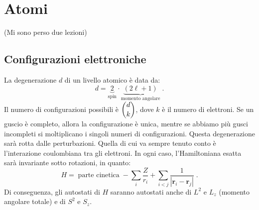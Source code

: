 \documentclass[12pt,a4paper]{report}
\theoremstyle{definition}
\numberwithin{equation}{section}
\begin{document}
\chapter{Atomi}
(Mi sono perso due lezioni)
\section{Configurazioni elettroniche}
La degenerazione $d$ di un livello atomico è data da:
\begin{equation}
d=\underbrace{2}_{\mbox{spin}}\cdot \underbrace{(2\ell +1)}_{\mbox{momento angolare}}\;.
\end{equation}
Il numero di configurazioni possibili è $\dbinom{d}{k}$, dove $k$ è il numero di elettroni. Se un guscio è completo, allora la configurazione è unica, mentre se abbiamo più gusci incompleti si moltiplicano i singoli numeri di configurazioni. Questa degenerazione sarà rotta dalle perturbazioni. Quella di cui va sempre tenuto conto è l'interazione coulombiana tra gli elettroni. In ogni caso, l'Hamiltoniana esatta sarà invariante sotto rotazioni, in quanto:
\begin{equation}
H=\;\mbox{parte cinetica}\;-\sum_i \frac{Z}{r_i}+\sum_{i<j}\frac{1}{|\mathbf{r}_i-\mathbf{r}_j|}\;.
\end{equation}
Di conseguenza, gli autostati di $H$ saranno autostati anche di $L^2$ e $L_z$ (momento angolare totale) e di $S^2$ e $S_z$.
\end{document}
